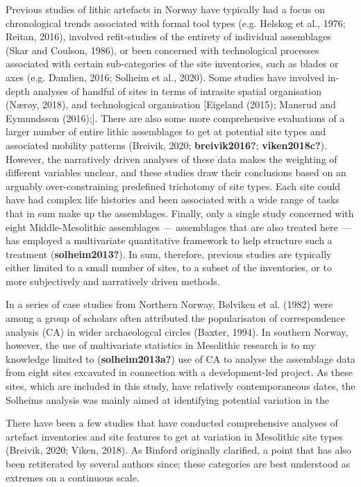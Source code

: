 \documentclass[
]{article}
\begin{document}
Previous studies of lithic artefacts in Norway have typically had a focus on chronological trends associated with formal tool types (e.g. Helskog et al., 1976; Reitan, 2016), involved refit-studies of the entirety of individual assemblages (Skar and Coulson, 1986), or been concerned with technological processes associated with certain sub-categories of the site inventories, such as blades or axes (e.g. Damlien, 2016; Solheim et al., 2020). Some studies have involved in-depth analyses of handful of sites in terms of intrasite spatial organisation (Nærøy, 2018), and technological organisation {[}Eigeland (2015); Mansrud and Eymundsson (2016);{]}. There are also some more comprehensive evaluations of a larger number of entire lithic assemblages to get at potential site types and associated mobility patterns (Breivik, 2020; \textbf{breivik2016?}; \textbf{viken2018c?}). However, the narratively driven analyses of these data makes the weighting of different variables unclear, and these studies draw their conclusions based on an arguably over-constraining predefined trichotomy of site types. Each site could have had complex life histories and been associated with a wide range of tasks that in sum make up the assemblages. Finally, only a single study concerned with eight Middle-Mesolithic assemblages --- assemblages that are also treated here --- has employed a multivariate quantitative framework to help structure such a treatment (\textbf{solheim2013?}). In sum, therefore, previous studies are typically either limited to a small number of sites, to a subset of the inventories, or to more subjectively and narratively driven methods.

In a series of case studies from Northern Norway, Bølviken et al. (1982) were among a group of scholars often attributed the popularisaton of correspondence analysis (CA) in wider archaeologcal circles (Baxter, 1994). In southern Norway, however, the use of multivariate statistics in Mesolithic research is to my knowledge limited to (\textbf{solheim2013a?}) use of CA to analyse the assemblage data from eight sites excavated in connection with a development-led project. As these sites, which are included in this study, have relatively contemporaneous dates, the Solheims analysis was mainly aimed at identifying potential variation in the

There have been a few studies that have conducted comprehensive analyses of artefact inventories and site features to get at variation in Mesolithic site types (Breivik, 2020; Viken, 2018). As Binford originally clarified, a point that has also been retiterated by several authors since; these categories are best understood as extremes on a continuous scale.
\end{document}
